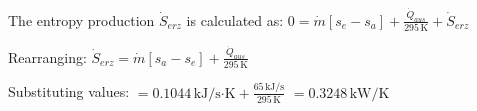 The entropy production \( \dot{S}_{erz} \) is calculated as:  
\( 0 = \dot{m} [s_e - s_a] + \frac{\dot{Q}_{aus}}{295 \, \text{K}} + \dot{S}_{erz} \)  

Rearranging:  
\( \dot{S}_{erz} = \dot{m} [s_a - s_e] + \frac{\dot{Q}_{aus}}{295 \, \text{K}} \)  

Substituting values:  
\( = 0.1044 \, \text{kJ/s·K} + \frac{65 \, \text{kJ/s}}{295 \, \text{K}} \)  
\( = 0.3248 \, \text{kW/K} \)